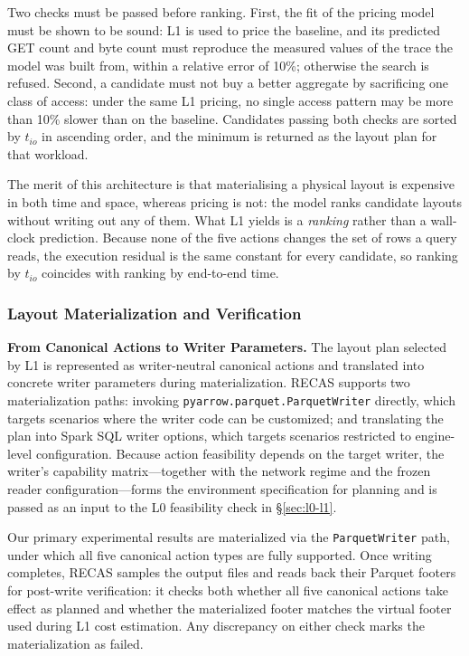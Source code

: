 Two checks must be passed before ranking. First, the fit of the pricing model
must be shown to be sound: L1 is used to price the baseline, and its predicted
GET count and byte count must reproduce the measured values of the trace the
model was built from, within a relative error of 10\%; otherwise the search is
refused. Second, a candidate must not buy a better aggregate by sacrificing one
class of access: under the same L1 pricing, no single access pattern may be
more than 10\% slower than on the baseline. Candidates passing both checks are
sorted by $t_{io}$ in ascending order, and the minimum is returned as the layout
plan for that workload.

The merit of this architecture is that materialising a physical layout is
expensive in both time and space, whereas pricing is not: the model ranks
candidate layouts without writing out any of them. What L1 yields is a
\emph{ranking} rather than a wall-clock prediction. Because none of the five
actions changes the set of rows a query reads, the execution residual is the
same constant for every candidate, so ranking by $t_{io}$ coincides with
ranking by end-to-end time.

\subsubsection{Layout Materialization and Verification}
\label{sec:layout-materialization}

\noindent\textbf{From Canonical Actions to Writer Parameters.}
The layout plan selected by L1 is represented as writer-neutral canonical actions and translated into concrete writer parameters during materialization.
\textsc{RECAS} supports two materialization paths: invoking \texttt{pyarrow.parquet.ParquetWriter} directly, which targets scenarios where the writer code can be customized; and translating the plan into Spark SQL writer options, which targets scenarios restricted to engine-level configuration.
Because action feasibility depends on the target writer, the writer's capability matrix—together with the network regime and the frozen reader configuration—forms the environment specification for planning and is passed as an input to the L0 feasibility check in \S\ref{sec:l0-l1}.

Our primary experimental results are materialized via the \texttt{ParquetWriter} path, under which all five canonical action types are fully supported.
Once writing completes, \textsc{RECAS} samples the output files and reads back their Parquet footers for post-write verification: it checks both whether all five canonical actions take effect as planned and whether the materialized footer matches the virtual footer used during L1 cost estimation.
Any discrepancy on either check marks the materialization as failed.

